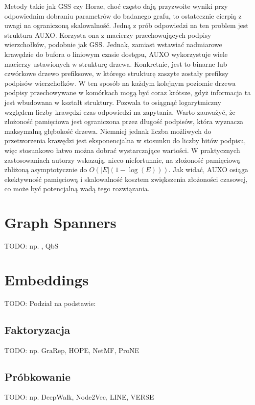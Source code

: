     Metody takie jak GSS czy Horae, choć często dają przyzwoite wyniki przy odpowiednim dobraniu parametrów do badanego grafu, to ostatecznie cierpią z uwagi na ograniczoną skalowalność. Jedną z prób odpowiedzi na ten problem jest struktura AUXO\cite{Jiang_Chen_Jin_2023}. Korzysta ona z macierzy przechowujących podpisy wierzchołków, podobnie jak GSS. Jednak, zamiast wstawiać nadmiarowe krawędzie do bufora o liniowym czasie dostępu, AUXO wykorzystuje wiele macierzy ustawionych w strukturę drzewa. Konkretnie, jest to binarne lub czwórkowe drzewo prefiksowe, w którego strukturę zaszyte zostały prefiksy podpisów wierzchołków. W ten sposób na każdym kolejnym poziomie drzewa podpisy przechowywane w komórkach mogą być coraz krótsze, gdyż informacja ta jest wbudowana w kształt struktury. Pozwala to osiągnąć logarytmiczny względem liczby krawędzi czas odpowiedzi na zapytania. Warto zauważyć, że złożoność pamięciowa jest ograniczona przez długość podpisów, która wyznacza maksymalną głębokość drzewa. Niemniej jednak liczba możliwych do przetworzenia krawędzi jest eksponencjalna w stosunku do liczby bitów podpisu, więc stosunkowo łatwo można dobrać wystarczające wartości. W praktycznych zastosowaniach autorzy wskazują, nieco niefortunnie, na złożoność pamięciową zbliżoną asymptotycznie do $O(|E|(1 - \log(E)))$. Jak widać, AUXO osiąga ekektywność pamięciową i skalowalność kosztem zwiększenia złożoności czasowej, co może być potencjalną wadą tego rozwiązania.

\section{Graph Spanners}
    TODO: np. \cite{Elkin_Trehan_2022}, QbS \cite{Wang_Wang_Koehler_Lin_2021}

\section{Embeddings}
    TODO: Podział na podstawie: \cite{Yang_Qu_Hussein_Rosso_Cudré-Mauroux_Liu_2023}

    \subsection{Faktoryzacja}
        TODO: np. GraRep, HOPE, NetMF, ProNE

    \subsection{Próbkowanie}
        TODO: np. DeepWalk, Node2Vec, LINE, VERSE

